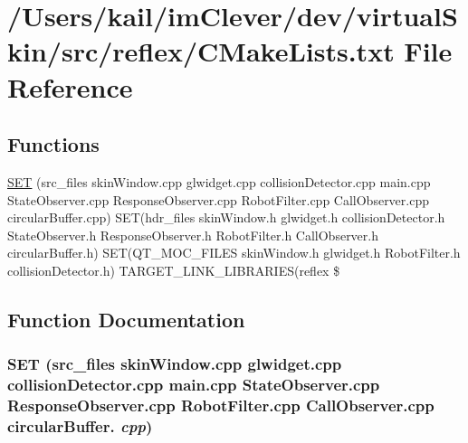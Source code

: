\hypertarget{src_2reflex_2_c_make_lists_8txt}{
\section{/Users/kail/imClever/dev/virtualSkin/src/reflex/CMakeLists.txt File Reference}
\label{src_2reflex_2_c_make_lists_8txt}
}
\subsection*{Functions}
\begin{DoxyCompactItemize}
\item 
\hyperlink{src_2reflex_2_c_make_lists_8txt_a79d7fa81f65070e5ac4d69e9d1978e78}{SET} (src\_\-files skinWindow.cpp glwidget.cpp collisionDetector.cpp main.cpp StateObserver.cpp ResponseObserver.cpp RobotFilter.cpp CallObserver.cpp circularBuffer.cpp) SET(hdr\_\-files skinWindow.h glwidget.h collisionDetector.h StateObserver.h ResponseObserver.h RobotFilter.h CallObserver.h circularBuffer.h) SET(QT\_\-MOC\_\-FILES skinWindow.h glwidget.h RobotFilter.h collisionDetector.h) TARGET\_\-LINK\_\-LIBRARIES(reflex \$
\end{DoxyCompactItemize}


\subsection{Function Documentation}
\hypertarget{src_2reflex_2_c_make_lists_8txt_a79d7fa81f65070e5ac4d69e9d1978e78}{
\subsubsection[{SET}]{\setlength{\rightskip}{0pt plus 5cm}SET (src\_\-files skinWindow.cpp glwidget.cpp collisionDetector.cpp main.cpp StateObserver.cpp ResponseObserver.cpp RobotFilter.cpp CallObserver.cpp circularBuffer. {\em cpp})}}
\label{src_2reflex_2_c_make_lists_8txt_a79d7fa81f65070e5ac4d69e9d1978e78}
